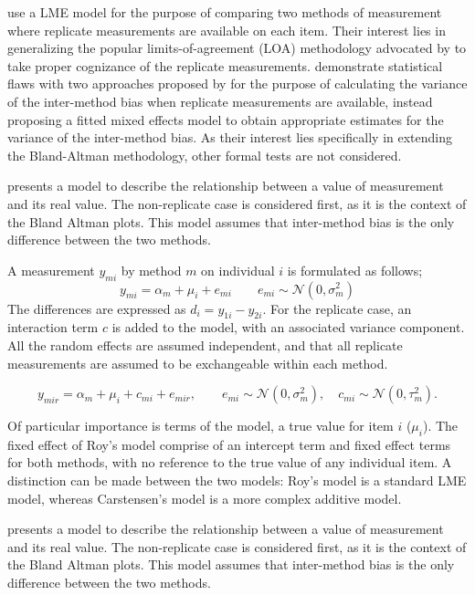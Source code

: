 \documentclass[12pt, a4paper]{report}
\theoremstyle{plain}
\theoremstyle{definition}
\theoremstyle{remark}
\begin{document}
\citet{BXC2008} use a LME model for the purpose of comparing two methods of measurement where replicate measurements are available on each item. Their interest lies in generalizing the popular limits-of-agreement (LOA) methodology advocated by \citet{BA86} to take proper cognizance of the replicate measurements. \citet{BXC2008} demonstrate statistical flaws with two approaches proposed by \citet{BA99} for the purpose of calculating the variance of the inter-method bias when replicate measurements are available, instead proposing a fitted mixed effects model to obtain appropriate estimates for the variance of the inter-method bias.  As their interest lies specifically in extending the Bland-Altman methodology, other formal tests are not considered.

\citet{BXC2004} presents a model to describe the relationship between a value of measurement and its
real value. The non-replicate case is considered first, as it is the context of the Bland Altman plots. This model assumes that inter-method bias is the only difference between the two methods.

A measurement $y_{mi}$ by method $m$ on individual $i$ is formulated as follows;
\begin{equation}
y_{mi}  = \alpha_{m} + \mu_{i} + e_{mi} \qquad  e_{mi} \sim
\mathcal{N}(0,\sigma^{2}_{m})
\end{equation}
The differences are expressed as $d_{i} = y_{1i} - y_{2i}$. For the replicate case, an interaction term $c$ is added to the model, with an associated variance component. All the random effects are assumed independent, and that all replicate measurements are assumed to be exchangeable within each method.

\begin{equation}
y_{mir}  = \alpha_{m} + \mu_{i} + c_{mi} + e_{mir}, \qquad  e_{mi}
\sim \mathcal{N}(0,\sigma^{2}_{m}), \quad c_{mi} \sim \mathcal{N}(0,\tau^{2}_{m}).
\end{equation}

Of particular importance is terms of the model, a true value for item $i$ ($\mu_{i}$).  The fixed effect of Roy's model comprise of an intercept term and fixed effect terms for both methods, with no reference to the true value of any individual item. A distinction can be made between the two models: Roy's model is a standard LME model, whereas Carstensen's model is a more complex additive model.

\citet{BXC2004} presents a model to describe the relationship between a value of measurement and its
real value. The non-replicate case is considered first, as it is the context of the Bland Altman plots. This model assumes that inter-method bias is the only difference between the two methods.
\end{document}
